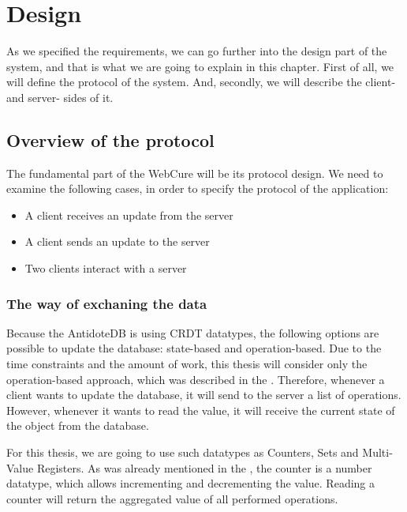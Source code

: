 \chapter{Design}
\label{Design}

As we specified the requirements, we can go further into the design part of the system, and that is what we are going to explain in this chapter. 
First of all, we will define the protocol of the system. And, secondly, we will describe the client- and server- sides of it.

\section{Overview of the protocol}

The fundamental part of the WebCure will be its protocol design. We need to examine the following cases, in order to specify the protocol of the application:

    \begin{itemize}
        \item {A client receives an update from the server}
        \item {A client sends an update to the server}
        \item {Two clients interact with a server}
    \end{itemize}

\subsection{The way of exchaning the data}

Because the AntidoteDB is using CRDT datatypes, the following options are possible to update the database: state-based and operation-based. Due to the time constraints and the amount of work, this thesis will consider only the operation-based approach, which was described in the . Therefore, whenever a client wants to update the database, it will send to the server a list of operations. However, whenever it wants to read the value, it will receive the current state of the object from the database.

For this thesis, we are going to use such datatypes as Counters, Sets and Multi-Value Registers. As was already mentioned in the , the counter is a number datatype, which allows incrementing and decrementing the value. Reading a counter will return the aggregated value of all performed operations.  

